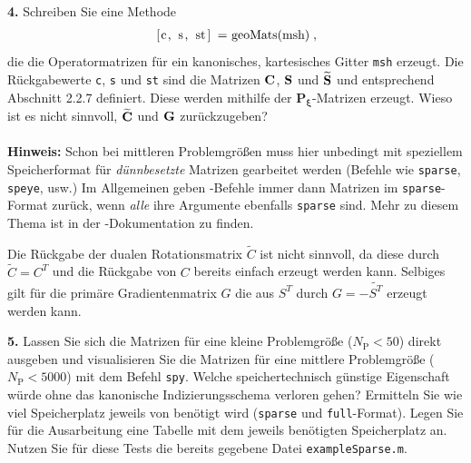 \documentclass[Protokollheft.tex]{subfiles}
\begin{document}
        \begin{framed}
	\noindent \textbf{4.} Schreiben Sie eine Methode
                    \begin{align}
                        \lstinline{[c, s, st] = geoMats(msh)} \; ,
                    \end{align}
                    die die Operatormatrizen für ein kanonisches, kartesisches
                    Gitter \lstinline{msh} erzeugt. Die Rückgabewerte
                    \lstinline{c}, \lstinline{s} und \lstinline{st}
                    sind die Matrizen $\mathbf{C}$, $\mathbf{S}$ und $\widetilde{\mathbf{S}}$
                    und entsprechend Abschnitt 2.2.7 definiert. Diese werden mithilfe der
${\mathbf{P_\xi}}$-Matrizen erzeugt.
                    Wieso ist es nicht sinnvoll, $\widetilde{\mathbf{C}}$ und $\mathbf{G}$ zurückzugeben?\\
                    \ \\
                    {\textbf{Hinweis:}} Schon bei mittleren Problemgrößen muss hier
                    unbedingt mit  speziellem Speicherformat für
                    \emph{dünnbesetzte} Matrizen gearbeitet werden (Befehle wie
                    \lstinline{sparse}, \lstinline{speye}, usw.) Im Allgemeinen geben
                    \matlab-Befehle immer dann Matrizen im \lstinline{sparse}-Format
                    zurück, wenn \emph{alle} ihre Argumente ebenfalls \lstinline{sparse}
                    sind. Mehr zu diesem Thema ist in der \matlab-Dokumentation zu finden.\label{exer:geoMats}
\end{framed}

Die Rückgabe der dualen Rotationsmatrix $\tilde{C}$ ist nicht sinnvoll, da diese durch $\tilde{C} = C^T$ und die Rückgabe von $C$ bereits einfach erzeugt werden kann. Selbiges gilt für die primäre Gradientenmatrix $G$ die aus $S^T$ durch $G = -\tilde{S^T}$ erzeugt werden kann. 

        \begin{framed}
	\noindent \textbf{5.} Lassen Sie sich die Matrizen für eine kleine Problemgröße ($N_{\text{P}}<50$) direkt
                    ausgeben und visualisieren Sie die Matrizen für eine mittlere
                    Problemgröße ($N_{\text{P}}<5000$) mit dem Befehl \lstinline{spy}. Welche speichertechnisch günstige
                    Eigenschaft würde ohne das kanonische Indizierungsschema verloren gehen?
                    Ermitteln Sie wie viel Speicherplatz jeweils von \matlab benötigt wird
                    (\lstinline{sparse} und \lstinline{full}-Format). Legen Sie für die Ausarbeitung eine Tabelle mit dem jeweils benötigten Speicherplatz an. Nutzen Sie für diese Tests die bereits gegebene Datei \lstinline{exampleSparse.m}.\label{exer:spyStorage}
\end{framed}
\end{document}
